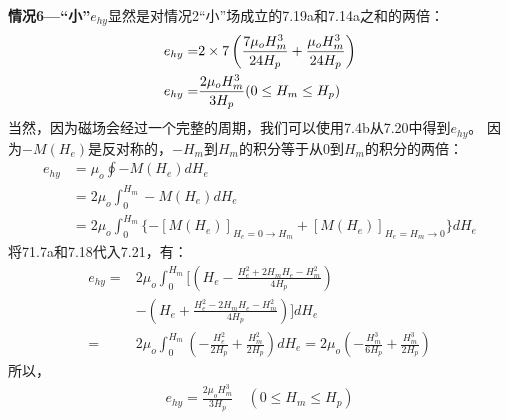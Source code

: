 \textbf{情况6---“小”}\quad $e_{hy}$显然是对情况2“小”场成立的7.19a和7.14a之和的两倍：
\begin{align}%
e_{hy}=&2\times7\left(\frac{7\mu_oH_{m}^{3}}{24H_p}+\frac{\mu_oH_{m}^{3}}{24H_p}\right)\\\notag
e_{hy}=&\frac{2\mu_oH_{m}^{3}}{3H_p}     (0\leq H_m\leq H_p)
\end{align}
当然，因为磁场会经过一个完整的周期，我们可以使用7.4b从7.20中得到$e_{hy}$。
因为$-M(H_e)$是反对称的，$-H_m$到$H_m$的积分等于从0到$H_m$的积分的两倍：
\begin{align*}%
e_{hy}&=\mu_o\oint-M(H_e)dH_e \\
&=2\mu_o\int_{0}^{H_m}-M(H_e)dH_e\\ 
&=2\mu_o\int_{0}^{H_m}\{-[M(H_e)]_{H_e=0\rightarrow H_m}+[M(H_e)]_{H_e=H_m\rightarrow 0}\}dH_e \tag{7.21}
\end{align*}
将71.7a和7.18代入7.21，有：
\begin{align*}%
e_{hy}=&2\mu_o\int_{0}^{H_m}\big[\left(H_e-\frac{H_{e}^{2}+2H_mH_e-H_{m}^{2}}{4H_p}\right) \\
&-\left(H_e+\frac{H_{e}^{2}-2H_mH_e-H_{m}^{2}}{4H_p}\right)\big]dH_e \\
=&2\mu_o\int_{0}^{H_m}\left(-\frac{H_{e}^{2}}{2H_p}+\frac{H_{m}^{2}}{2H_p}\right)dH_e=2\mu_o\left(-\frac{H_{m}^{3}}{6H_p}+\frac{H_{m}^{3}}{2H_p}\right)
\end{align*}
所以，
\begin{align*}
e_{hy}=\frac{2\mu_oH_{m}^{3}}{3H_p} \quad (0\leq H_m\leq H_p) \tag{7.20}
\end{align*}

